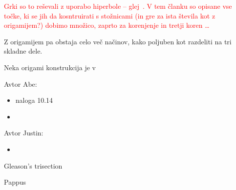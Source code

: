 


\textcolor{red}{Grki so to reševali z uporabo hiperbole -- glej~\cite[str.\ 9]{videla1997}. V tem članku so opisane vse točke, ki se jih da kosntruirati s stožnicami (in gre za ista števila kot z origamijem?) dobimo množico, zaprto za korenjenje in tretji koren \ldots}

Z origamijem pa obstaja celo več načinov, kako poljuben kot razdeliti na tri skladne dele.

Neka origami konstrukcija je v~\cite[str.\ 155]{geometricconstructions}


Avtor Abe:
\begin{itemize}
    \item naloga 10.14~\cite[str.\ 158 spodaj]{geometricconstructions}
    \item \cite[str.\ 33]{lang2013}
\end{itemize}

Avtor Justin:
\begin{itemize}
    \item \cite[str.\ 34]{lang2013}
\end{itemize}

Gleason's trisection~\cite{gleason1988}

Pappus~\cite[str.\ 154--155]{geometricconstructions}

